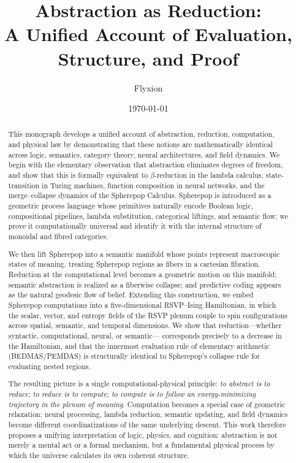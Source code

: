 \documentclass[12pt,letterpaper]{article}
\title{\textbf{Abstraction as Reduction:}\\
A Unified Account of Evaluation, Structure, and Proof}
\author{Flyxion}
\date{\today}
\begin{document}
\maketitle
\thispagestyle{empty}

\begin{abstract}
This monograph develops a unified account of abstraction, reduction, computation, 
and physical law by demonstrating that these notions are mathematically identical 
across logic, semantics, category theory, neural architectures, and field dynamics.  
We begin with the elementary observation that abstraction eliminates degrees of 
freedom, and show that this is formally equivalent to $\beta$-reduction in the 
lambda calculus, state-transition in Turing machines, function composition in 
neural networks, and the merge--collapse dynamics of the Spherepop Calculus.  
Spherepop is introduced as a geometric process language whose primitives naturally 
encode Boolean logic, compositional pipelines, lambda substitution, categorical 
liftings, and semantic flow; we prove it computationally universal and identify it 
with the internal structure of monoidal and fibred categories.  

We then lift Spherepop into a semantic manifold whose points represent macroscopic 
states of meaning, treating Spherepop regions as fibers in a cartesian fibration.  
Reduction at the computational level becomes a geometric motion on this manifold; 
semantic abstraction is realized as a fiberwise collapse; and predictive coding 
appears as the natural geodesic flow of belief.  Extending this construction, we 
embed Spherepop computations into a five-dimensional RSVP--Ising Hamiltonian, in 
which the scalar, vector, and entropy fields of the RSVP plenum couple to 
spin configurations across spatial, semantic, and temporal dimensions.  
We show that reduction---whether syntactic, computational, neural, or semantic---
corresponds precisely to a decrease in the Hamiltonian, and that the innermost 
evaluation rule of elementary arithmetic (BEDMAS/PEMDAS) is structurally identical 
to Spherepop's collapse rule for evaluating nested regions.  

The resulting picture is a single computational-physical principle:  
\emph{to abstract is to reduce; to reduce is to compute; to compute is to follow an 
energy-minimizing trajectory in the plenum of meaning}.  
Computation becomes a special case of geometric relaxation; neural processing, 
lambda reduction, semantic updating, and field dynamics become different 
coordinatizations of the same underlying descent.  
This work therefore proposes a unifying interpretation of logic, physics, and 
cognition: abstraction is not merely a mental act or a formal mechanism, but a 
fundamental physical process by which the universe calculates its own coherent 
structure.
\end{abstract}
\end{document}
